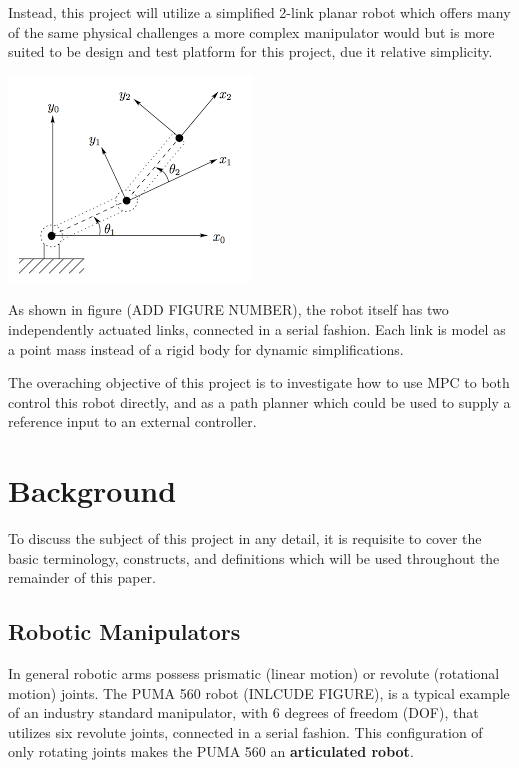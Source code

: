 \documentclass[journal]{IEEEtran}
\begin{document}
Instead, this project will utilize a simplified 2-link planar robot which offers many of the same physical challenges a more complex manipulator would but is more suited to be design and test platform for this project, due it relative simplicity.


\includegraphics[scale=.5]{../images/2d_arm_2}


As shown in figure (ADD FIGURE NUMBER), the robot itself has two independently actuated links, connected in a serial fashion. Each link is model as a point mass instead of a rigid body for dynamic simplifications.

The overaching objective of this project is to investigate how to use MPC to both control this robot directly, and as a path planner which could be used to supply a reference input to an external controller.




\section{Background}
To discuss the subject of this project in any detail, it is requisite to cover the basic terminology, constructs, and definitions which will be used throughout the remainder of this paper.

\subsection{Robotic Manipulators}

In general robotic arms possess prismatic (linear motion) or revolute (rotational motion) joints. The PUMA 560 robot (INLCUDE FIGURE), is a typical example of an industry standard manipulator, with 6 degrees of freedom (DOF), that utilizes six revolute joints, connected in a serial fashion. This configuration of only rotating joints makes the PUMA 560 an \textbf{articulated robot}. \\
\end{document}
